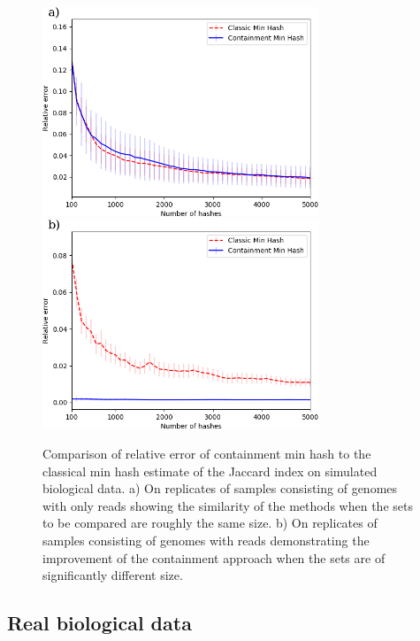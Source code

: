 \documentclass[11pt]{amsart}
\theoremstyle{remark}
\numberwithin{equation}{section}
\newcommand{\themethod}{containment min hash }
\newcommand{\SimulatedBiologicalDataNumGenomes}{\protect }
\newcommand{\SimulatedBiologicalDataNumReads}{\protect }
\newcommand{\SimulatedBiologicalDataNumReplicates}{\protect }
\newcommand{\SimulatedBiologicalDataSmallNumGenomes}{\protect }
\newcommand{\SimulatedBiologicalDataSmallNumReads}{\protect }
\newcommand{\SimulatedBiologicalDataSmallNumReplicates}{\protect }
\begin{document}
\begin{figure}[!h]%
\begin{center}
\includegraphics[width=3.25in,trim={0 0 0 0in},clip]{Figs/SimulatedBiologicalData_small.png}%
\includegraphics[width=3.25in,trim={0 0 0 0in},clip]{Figs/SimulatedBiologicalData.png}
\end{center}
\caption{Comparison of relative error of \themethod to the classical min hash estimate of the Jaccard index on simulated biological data. a) On \SimulatedBiologicalDataSmallNumReplicates replicates of samples consisting of \SimulatedBiologicalDataSmallNumGenomes genomes with only \SimulatedBiologicalDataSmallNumReads reads showing the similarity of the methods when the sets to be compared are roughly the same size. b) On \SimulatedBiologicalDataNumReplicates replicates of samples consisting of \SimulatedBiologicalDataNumGenomes genomes with \SimulatedBiologicalDataNumReads reads demonstrating the improvement of the containment approach when the sets are of significantly different size.
}
\label{fig:SimulatedBiologicalData}%
\end{figure}

\subsection{Real biological data}
\end{document}
